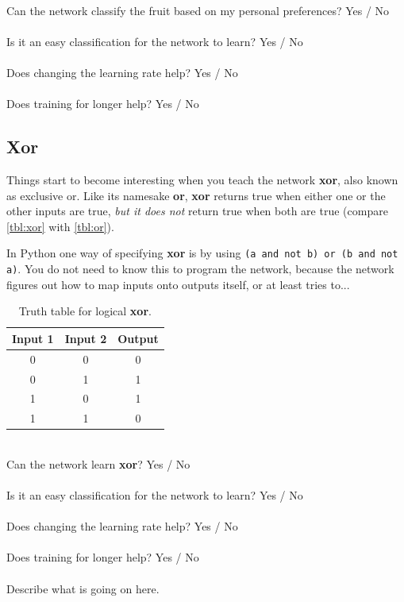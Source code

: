 \documentclass[a4paper,10pt]{article}
\begin{document}
\ \\ Can the network classify the fruit based on my personal preferences?    Yes / No   
\ \\

\ \\ Is it an easy classification for the network to learn? Yes / No
\ \\

\ \\ Does changing the learning rate help?    Yes / No   
\ \\


\ \\ Does training for longer help?    Yes / No   
\ \\



\subsection{Xor}
Things start to become interesting when you teach the network \textbf{xor}, also known as exclusive or. Like its namesake \textbf{or}, \textbf{xor} returns true when either one or the other inputs are true, \emph{but it does not} return true when both are true (compare \autoref{tbl:xor} with \autoref{tbl:or}).  


In Python one way of specifying \textbf{xor} is by using \texttt{(a and not b) or (b and not a)}. You do not need to know this to program the network, because the network figures out how to map inputs onto outputs itself, or at least tries to...

\begin{table}[ht]
 \centering
 \begin{tabular}[t]{ccc}
Input 1 & Input 2 & Output\\ \hline
0 & 0 & 0\\
0 & 1 & 1 \\
1 & 0 & 1 \\
1 & 1 & 0 \\

\end{tabular} \caption{Truth table for logical \textbf{xor}.}
 \label{tbl:xor}
\end{table}


\ \\ Can the network learn \textbf{xor}?    Yes / No   
\ \\

\ \\ Is it an easy classification for the network to learn? Yes / No
\ \\


\ \\ Does changing the learning rate help?    Yes / No   
\ \\


\ \\ Does training for longer help?    Yes / No   
\ \\

\ \\  Describe what is going on here.
\ \\
\end{document}
